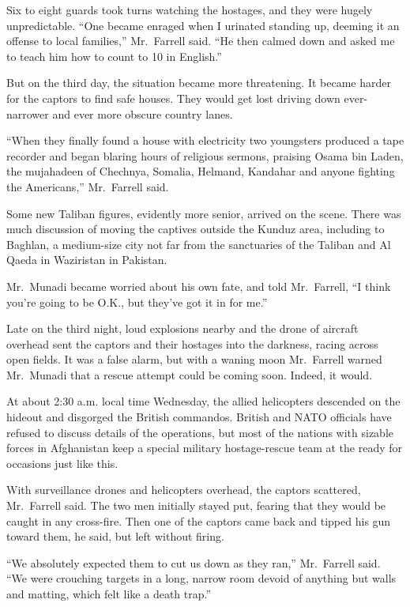 ﻿\documentclass[12pt]{article}
\begin{document}
Six to eight guards took turns watching the hostages, and they were hugely unpredictable. ``One
became enraged when I urinated standing up, deeming it an offense to local families,'' Mr.~Farrell
said. ``He then calmed down and asked me to teach him how to count to 10 in English.''

But on the third day, the situation became more threatening. It became harder for the captors to
find safe houses. They would get lost driving down ever-narrower and ever more obscure country
lanes.

``When they finally found a house with electricity two youngsters produced a tape recorder and began
blaring hours of religious sermons, praising Osama bin Laden, the mujahadeen of Chechnya, Somalia,
Helmand, Kandahar and anyone fighting the Americans,'' Mr.~Farrell said.

Some new Taliban figures, evidently more senior, arrived on the scene. There was much discussion of
moving the captives outside the Kunduz area, including to Baghlan, a medium-size city not far from
the sanctuaries of the Taliban and Al Qaeda in Waziristan in Pakistan.

Mr.~Munadi became worried about his own fate, and told Mr.~Farrell, ``I think you're going to be
O.K., but they've got it in for me.''

Late on the third night, loud explosions nearby and the drone of aircraft overhead sent the captors
and their hostages into the darkness, racing across open fields. It was a false alarm, but with a
waning moon Mr.~Farrell warned Mr.~Munadi that a rescue attempt could be coming soon. Indeed, it
would.

At about 2:30 a.m. local time Wednesday, the allied helicopters descended on the hideout and
disgorged the British commandos. British and NATO officials have refused to discuss details of the
operations, but most of the nations with sizable forces in Afghanistan keep a special military
hostage-rescue team at the ready for occasions just like this.

With surveillance drones and helicopters overhead, the captors scattered, Mr.~Farrell said. The two
men initially stayed put, fearing that they would be caught in any cross-fire. Then one of the
captors came back and tipped his gun toward them, he said, but left without firing.

``We absolutely expected them to cut us down as they ran,'' Mr.~Farrell said. ``We were crouching
targets in a long, narrow room devoid of anything but walls and matting, which felt like a death
trap.''
\end{document}
